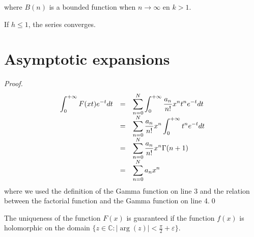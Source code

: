     \noindent where $B(n)$ is a bounded function when $n\rightarrow\infty$ en $k > 1$.
    
    \begin{theorem}
		If $h \leq 1$, the series converges.
	\end{theorem}
    
\section{Asymptotic expansions}
    
    \begin{proof}
    \begin{equation}
    	\begin{array}{ccl}
    		\ds\int_0^{+\infty}F(xt)e^{-t}dt&=&\ds\sum_{n=0}^N\int_0^{+\infty}\stylefrac{a_n}{n!}x^nt^ne^{-t}dt\\
            &=&\ds\sum_{n=0}^N\frac{a_n}{n!}x^n\int_0^{+\infty}t^ne^{-t}dt\\
            &=&\ds\sum_{n=0}^N\frac{a_n}{n!}x^n\Gamma(n+1)\\
            &=&\ds\sum_{n=0}^Na_nx^n
    	\end{array}
        \end{equation}
        where we used the definition of the Gamma function on line 3 and the relation between the factorial function and the Gamma function on line 4.\qed
    \end{proof}
    \begin{theorem}
    	The uniqueness of the function $F(x)$ is guaranteed if the function $f(x)$ is holomorphic on the domain $\{z\in\mathbb{C} : |\arg(z)| < \frac{\pi}{2} + \varepsilon\}$.
    \end{theorem}